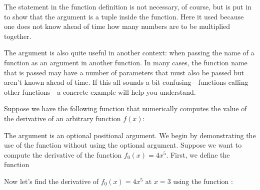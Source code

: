 \documentclass[letterpaper,10pt,english]{sphinxmanual}
\begin{document}
\sphinxAtStartPar
The  statement in the function definition is not necessary, of course, but is put in to show that the argument  is a tuple inside the function.  Here it used because one does not know ahead of time how many numbers are to be multiplied together.

\sphinxAtStartPar
The  argument is also quite useful in another context: when passing the name of a function as an argument in another function.  In many cases, the function name that is passed may have a number of parameters that must also be passed but aren’t known ahead of time.  If this all sounds a bit confusing—functions calling other functions—a concrete example will help you understand.

\sphinxAtStartPar
Suppose we have the following function that numerically computes the value of the derivative of an arbitrary function \(f(x)\):

\begin{sphinxVerbatim}[commandchars=\\\{\}]
    
       
\end{sphinxVerbatim}

\sphinxAtStartPar
The argument  is an optional positional argument.  We begin by demonstrating the use of the function  without using the optional  argument.  Suppose we want to compute the derivative of the function \(f_0(x)=4x^5\).  First, we define the function

\begin{sphinxVerbatim}[commandchars=\\\{\}]
 
     
\end{sphinxVerbatim}

\sphinxAtStartPar
Now let’s find the derivative of \(f_0(x)=4x^5\) at \(x=3\) using the function :
\end{document}
